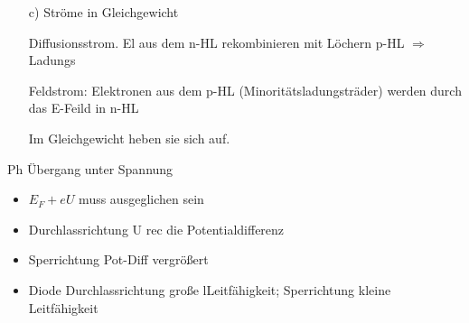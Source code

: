 \begin{enumerate}
\begin{enumerate}
  \item[c)] Ströme in Gleichgewicht

Diffusionsstrom. El aus dem n-HL rekombinieren mit Löchern p-HL \(\Rightarrow \) Ladungs

Feldstrom: Elektronen aus dem p-HL (Minoritätsladungsträder) werden durch das E-Feild in n-HL

Im Gleichgewicht heben sie sich auf. 
  \end{enumerate}

Ph Übergang unter Spannung
\begin{itemize}
\item \(E_F+eU\) muss ausgeglichen sein
\item Durchlassrichtung U rec  die Potentialdifferenz
\item Sperrichtung Pot-Diff vergrößert
\item Diode Durchlassrichtung große lLeitfähigkeit; Sperrichtung kleine Leitfähigkeit
\end{itemize}


\end{enumerate}




